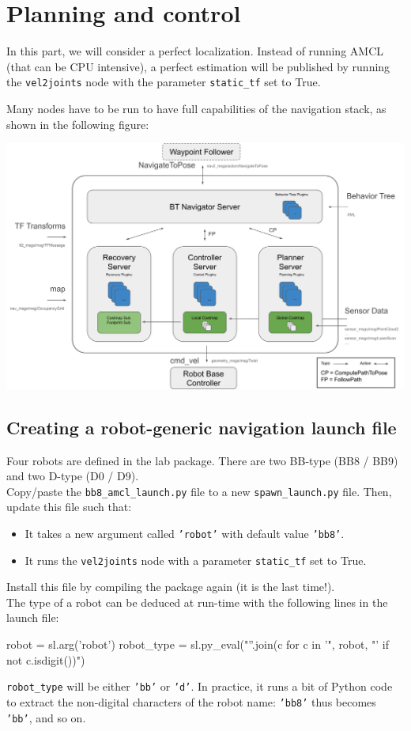 \documentclass{ecnreport}
\begin{document}
\section{Planning and control}

In this part, we will consider a perfect localization. Instead of running AMCL (that can be CPU intensive), a perfect estimation 
will be published by running the \texttt{vel2joints} node with the parameter \texttt{static\_tf} set to True.

Many nodes have to be run to have full capabilities of the navigation stack, as shown in the following figure:
\begin{center}
 \includegraphics[width=.7\linewidth]{nav2_architectural_diagram}
\end{center}

\subsection{Creating a robot-generic navigation launch file}

Four robots are defined in the lab package. There are two BB-type (BB8 / BB9) and two D-type (D0 / D9).\\

Copy/paste the \texttt{bb8\_amcl\_launch.py} file to a new \texttt{spawn\_launch.py} file. Then, update this file such that:
\begin{itemize}
 \item It takes a new argument called \texttt{'robot'} with default value \texttt{'bb8'}.
 \item It runs the \texttt{vel2joints} node with a parameter \texttt{static\_tf} set to True. 
\end{itemize}

Install this file by compiling the package again (it is the last time!).\\

The type of a robot can be deduced at run-time with the following lines in the launch file:
\begin{pythoncodelarge}
robot = sl.arg('robot')
robot_type = sl.py_eval("''.join(c for c in '", robot, "' if not c.isdigit())") 
\end{pythoncodelarge}\texttt{robot\_type} will be either \texttt{'bb'} or \texttt{'d'}. In practice, it runs a bit of Python code to extract the non-digital characters of the robot name: \texttt{'bb8'} thus becomes \texttt{'bb'}, and so on.\\
\end{document}
